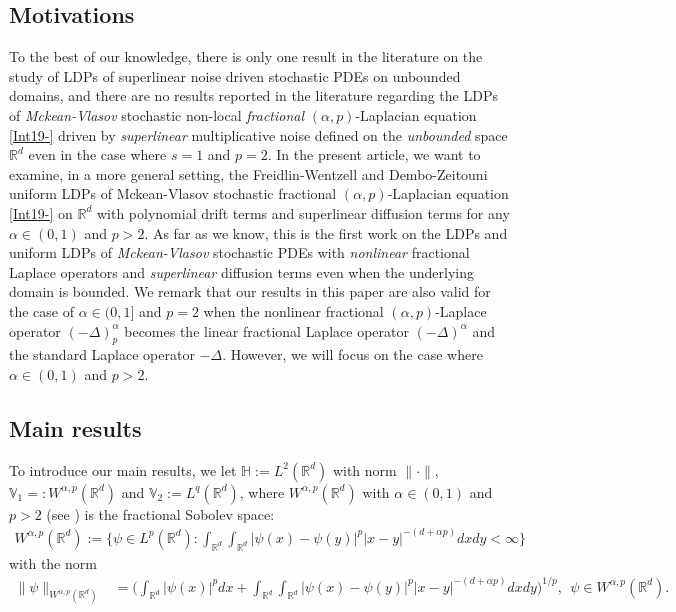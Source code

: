 \documentclass[11pt]{article}
\numberwithin{equation}{section}
\begin{document}
\subsection{Motivations}
To the best of our knowledge, there is only one result \cite{Wang2024submitted} in the literature  on the study of LDPs of
superlinear noise driven stochastic PDEs on unbounded domains, and there are no results reported in the literature regarding the LDPs of
\emph{Mckean-Vlasov}
stochastic non-local \emph{fractional} $(\alpha,p)$-Laplacian equation \eqref{Int19-} driven by \emph{superlinear}
multiplicative noise
 defined on the
\emph{unbounded} space $\mathbb{R}^d$ even
 in the case where $s=1$ and $p=2$. In the present article, we want to examine, in a more general setting, the Freidlin-Wentzell and Dembo-Zeitouni uniform LDPs of
Mckean-Vlasov stochastic fractional $(\alpha,p)$-Laplacian equation \eqref{Int19-} on $\mathbb{R}^d$ with polynomial drift terms and  superlinear diffusion terms for any $\alpha\in(0,1)$ and $p>2$. As far as we know, this is the first work on the LDPs and uniform LDPs of \emph{Mckean-Vlasov} stochastic  PDEs with \emph{nonlinear} fractional Laplace operators and \emph{superlinear} diffusion terms even when the underlying domain is bounded. We remark that our results in this paper are also
valid for the case of $\alpha\in(0,1]$
and $p=2$ when the nonlinear fractional  $(\alpha,p)$-Laplace
operator $(-\Delta)_{p}^\alpha$ becomes
the linear fractional Laplace operator $(-\Delta)^\alpha$
and  the standard Laplace operator $-\Delta$. However, we will
focus on    the case  where $\alpha\in(0,1)$ and $p>2$.


\subsection{Main results}
To introduce our main results, we let $\mathbb{H}:=L^2(\mathbb{R}^d)$
with norm $\| \cdot \|$,
$\mathbb{V}_1=
:W^{\alpha,p}(\mathbb{R}^d)$ and
$\mathbb{V}_2:= L^q(\mathbb{R}^d)$,
where $W^{\alpha,p}(\mathbb{R}^d)$ with $\alpha\in(0,1)$ and $p>2$ (see \cite{Di2012bull}) is the
fractional Sobolev space:
\begin{align*}
W^{\alpha,p}(\mathbb{R}^d):= \bigg\{\psi\in L^p(\mathbb{R}^d):\int_{\mathbb{R}^d}
\int_{\mathbb{R}^d}|\psi(x)-\psi(y)|^p|x-y|^{-(d+\alpha p)}
dxdy<\infty  \bigg\}
\end{align*}
with the  norm
\begin{align}\label{int4}
\|\psi\|_{W^{\alpha,p}(\mathbb{R}^d)}&
=\bigg(\int_{\mathbb{R}^d}|\psi(x)|^pdx+
\int_{\mathbb{R}^d}
\int_{\mathbb{R}^d}|\psi(x)-
\psi(y)|^p|x-y|^{-(d+\alpha p)}
dxdy\bigg)^{1/p},\ \ \psi\in W^{\alpha,p}(\mathbb{R}^d).
\end{align}
\end{document}
